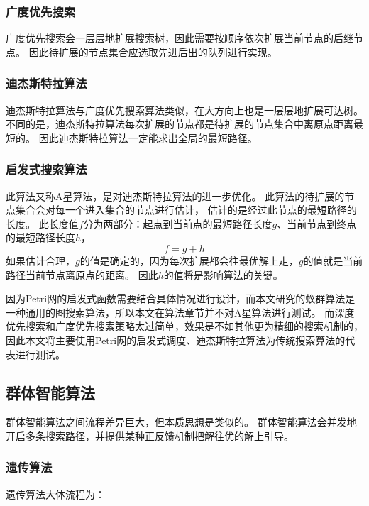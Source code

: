         \subsubsection{广度优先搜索}
        广度优先搜索会一层层地扩展搜索树，因此需要按顺序依次扩展当前节点的后继节点。
        因此待扩展的节点集合应选取先进后出的队列进行实现\cite{cormen2009introduction}\cite{yang2019approximating}\cite{liu2015new}\cite{mehlhorn1999data}\cite{yu2015research}。
        \subsubsection{迪杰斯特拉算法}
        迪杰斯特拉算法与广度优先搜索算法类似，在大方向上也是一层层地扩展可达树。
        不同的是，迪杰斯特拉算法每次扩展的节点都是待扩展的节点集合中离原点距离最短的。
        因此迪杰斯特拉算法一定能求出全局的最短路径\cite{dijkstra1959note}\cite{cormen2009introduction}\cite{sedgewick1990algorithms}\cite{dijkstra1976discipline}\cite{brandes2005centrality}。
        \subsubsection{启发式搜索算法}
        此算法又称A星算法，是对迪杰斯特拉算法的进一步优化。
        此算法的待扩展的节点集合会对每一个进入集合的节点进行估计，
        估计的是经过此节点的最短路径的长度。
        此长度值$f$分为两部分：起点到当前点的最短路径长度$g$、当前节点到终点的最短路径长度$h$，
        $$
            f=g+h
        $$
        如果估计合理，$g$的值是确定的，因为每次扩展都会往最优解上走，$g$的值就是当前路径当前节点离原点的距离。
        因此$h$的值将是影响算法的关键。

        因为Petri网的启发式函数需要结合具体情况进行设计，而本文研究的蚁群算法是一种通用的图搜索算法，所以本文在算法章节并不对A星算法进行测试。
        而深度优先搜索和广度优先搜索策略太过简单，效果是不如其他更为精细的搜索机制的，因此本文将主要使用Petri网的启发式调度、迪杰斯特拉算法为传统搜索算法的代表进行测试\cite{hart1968formal}\cite{russell2010artificial}\cite{nash2011incremental}\cite{sturtevant2012benchmarks}\cite{botea2004near}。
    \subsection{群体智能算法}
        群体智能算法之间流程差异巨大，但本质思想是类似的。
        群体智能算法会并发地开启多条搜索路径，并提供某种正反馈机制把解往优的解上引导。
        \subsubsection{遗传算法}
            遗传算法大体流程为：


